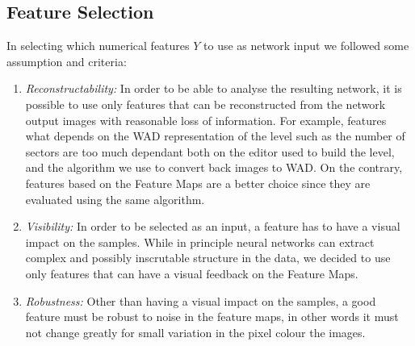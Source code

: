 \subsection{Feature Selection}
In selecting which numerical features $Y$ to use as network input we followed some assumption and criteria:
\begin{enumerate}
	\item \textit{Reconstructability:} In order to be able to analyse the resulting network, it is possible to use only features that can be reconstructed from the network output images with reasonable loss of information. For example, features what depends on the WAD representation of the level such as the number of sectors are too much dependant both on the editor used to build the level, and the algorithm we use to convert back images to WAD. On the contrary, features based on the Feature Maps are a better choice since they are evaluated using the same algorithm.
	\item \textit{Visibility:} In order to be selected as an input, a feature has to have a visual impact on the samples. While in principle neural networks can extract complex and possibly inscrutable structure in the data, we decided to use only features that can have a visual feedback on the Feature Maps.
	\item \textit{Robustness:} Other than having a visual impact on the samples, a good feature must be robust to noise in the feature maps, in other words it must not change greatly for small variation in the pixel colour the images. 
\end{enumerate}



